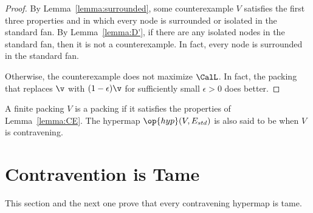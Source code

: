 \begin{proof} By Lemma~\ref{lemma:surrounded}, some counterexample $V$
  satisfies the first three properties and in which every node is
  surrounded or isolated in the standard fan.  By
  Lemma~\ref{lemma:D'}, if there are any isolated nodes in the
  standard fan, then it is not a counterexample.  In fact, every node
  is surrounded in the standard fan.

    Otherwise, the counterexample does not
  maximize $\CalL$.  In fact, the packing that replaces $\v$ with
  $(1-\epsilon)\v$ for sufficiently small $\epsilon>0$ does better.
\end{proof}


\begin{definition}[contravening]\label{def:contravening}
  A finite packing  $V$ is a  packing if it
  satisfies the properties of Lemma~\ref{lemma:CE}.  The
 hypermap $\op{hyp}(V,E_{std})$ is also said to be
   when $V$ is contravening.
\end{definition}






\section{Contravention is Tame}
%
\label{sec:contraproof}

This section and the next one prove that every contravening hypermap is tame.

